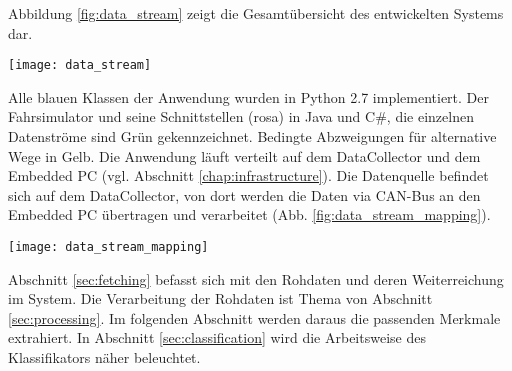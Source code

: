 \label{chap:implementation}

Abbildung \ref{fig:data_stream} zeigt die Gesamtübersicht des entwickelten Systems dar. 
\begin{figure*} 
  \begin{center}
    \texttt{[image: data\_stream]}
    \caption[Aufbau der Anwendung]{Der Aufbau des entwickelten System zur Müdigkeitserkennung. Grün: Datenströme, Blau: Python Klassen der Anwendung, Gelb: bedingte Abzweigungen, Rosa: Klassen der Fahrsimulatorumgebung\label{fig:data_stream}}
  \end{center}
\end{figure*}
Alle blauen Klassen der Anwendung wurden in Python 2.7 implementiert. Der Fahrsimulator und seine Schnittstellen (rosa) in Java und C\#, die einzelnen Datenströme sind Grün gekennzeichnet. Bedingte Abzweigungen für alternative Wege in Gelb. Die Anwendung läuft verteilt auf dem DataCollector und dem Embedded PC (vgl. Abschnitt \ref{chap:infrastructure}). Die Datenquelle befindet sich auf dem DataCollector, von dort werden die Daten via CAN-Bus an den Embedded PC übertragen und verarbeitet (Abb. \ref{fig:data_stream_mapping}). 
\begin{figure*} 
  \begin{center}
    \texttt{[image: data\_stream\_mapping]}
    \caption[Einbettung der Anwendung]{Datenquelle und Verarbeitung sind verteilt im Fahrsimulator eingebettet. Die Übertrageung erfolgt via CAN-Bus. \label{fig:data_stream_mapping}}
  \end{center}
\end{figure*}
Abschnitt \ref{sec:fetching} befasst sich mit den Rohdaten und deren Weiterreichung im System. Die Verarbeitung der Rohdaten ist Thema von Abschnitt \ref{sec:processing}. Im folgenden Abschnitt werden daraus die passenden Merkmale extrahiert. In Abschnitt \ref{sec:classification} wird die Arbeitsweise des Klassifikators näher beleuchtet. 


